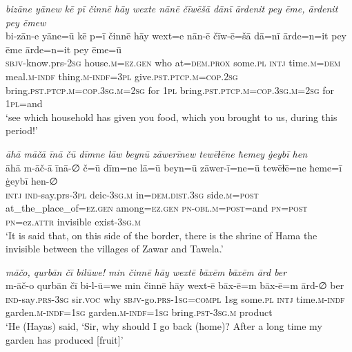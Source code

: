 \ea \label{BP.161}
\textit{bizāne yānew kē pī činnē hāy wexte nānē čīwēšā dānī ārdenit pey ēme, ārdenit pey ēmew} \\ 
\gll bi-zān-e yāne=ū kē p=ī činnē hāy wext=e nān-ē čīw-ē=šā dā=nī ārde=n=it pey ēme ārde=n=it pey ēme=ū \\ 
 \textsc{sbjv-}know.prs-\textsc{2sg} house\textsc{.m}\textsc{=ez.gen} who at=\textsc{dem.prox} some\textsc{.pl} \textsc{intj} time\textsc{.m}\textsc{=dem} meal\textsc{.m}\textsc{-indf} thing\textsc{.m}\textsc{-indf}\textsc{=3pl} give\textsc{.pst}\textsc{.ptcp}\textsc{.m}\textsc{=cop}\textsc{.\textsc{2sg}} bring\textsc{.pst}\textsc{.ptcp}\textsc{.m}\textsc{=cop}\textsc{.3sg}\textsc{.m}\textsc{=\textsc{2sg}} for \textsc{1pl} bring\textsc{.pst}\textsc{.ptcp}\textsc{.m}\textsc{=cop}\textsc{.3sg}\textsc{.m}\textsc{=\textsc{2sg}} for \textsc{1pl}=and \\ 
\glt `see which household has given you food, which you brought to us, during this period!'
\z 
 
\ea \label{BP.178}
\textit{āhā māčā īnā čū dīmne lāw beynū zāwerīnew tewēɫēne ħemey ġeybī hen} \\ 
\gll āhā m-āč-ā īnā-∅ č=ū dīm=ne lā=ū beyn=ū zāwer-ī=ne=ū tewēɫē=ne ħeme=ī ġeybī hen-∅ \\ 
 \textsc{intj} \textsc{ind-}say.prs\textsc{-3pl} deic\textsc{-3sg}\textsc{.m} in=\textsc{dem.dist}\textsc{.3sg} side\textsc{.m}\textsc{=\textsc{post}} at\_the\_place\_of\textsc{=ez.gen} among\textsc{=ez.gen} \textsc{pn}\textsc{-obl}\textsc{.m}\textsc{=\textsc{post}}=and \textsc{pn}\textsc{=\textsc{post}} \textsc{pn}=ez.\textsc{attr} invisible exist\textsc{-3sg}\textsc{.m} \\ 
\glt `It is said that, on this side of the border, there is the shrine of Hama the invisible between the villages of Zawar and Tawela.'
\z 
 
\ea \label{ŽH.113}
\textit{māčo, qurbān čī bilūwe! min činnē hāy wextē bāxēm bāxēm ārd ber} \\ 
\gll m-āč-o qurbān čī bi-l-ū=we min činnē hāy wext-ē bāx-ē=m bāx-ē=m ārd-∅ ber \\ 
 \textsc{ind-}say\textsc{.prs}\textsc{-3sg} sir.\textsc{voc} why \textsc{sbjv-}go\textsc{.prs}\textsc{-1sg}\textsc{=compl} 1sg some\textsc{.pl} \textsc{intj} time\textsc{.m}\textsc{-indf} garden\textsc{.m}\textsc{-indf}\textsc{=1sg} garden\textsc{.m}\textsc{-indf}\textsc{=1sg} bring\textsc{.pst}\textsc{-3sg}\textsc{.m} product \\ 
\glt `He (Hayas) said, ‘Sir, why should I go back (home)? After a long time my garden has produced [fruit]'
\z 
 
